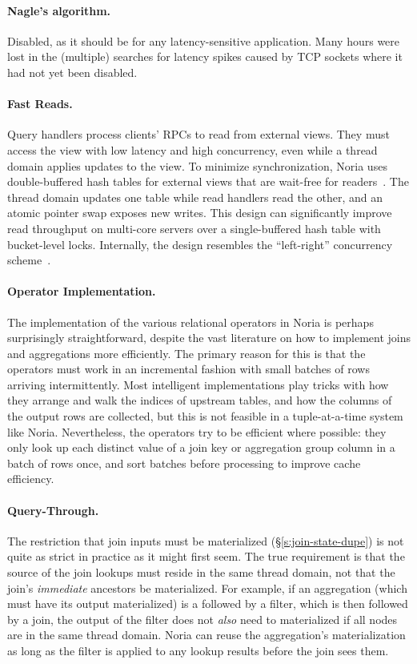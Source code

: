 \paragraph{Nagle's algorithm.} Disabled, as it should be for any
latency-sensitive application. Many hours were lost in the (multiple) searches
for latency spikes caused by TCP sockets where it had not yet been disabled.

\paragraph{Fast Reads.}
Query handlers process clients' RPCs to read from external views. They must
access the view with low latency and high concurrency, even while a thread
domain applies updates to the view. To minimize synchronization, Noria uses
double-buffered hash tables for external views that are wait-free for
readers~\cite{evmap}. The thread domain updates one table while read handlers
read the other, and an atomic pointer swap exposes new writes. This design can
significantly improve read throughput on multi-core servers over a
single-buffered hash table with bucket-level locks. Internally, the design
resembles the ``left-right'' concurrency scheme~\cite{left-right}.

\paragraph{Operator Implementation.}
The implementation of the various relational operators in Noria is perhaps
surprisingly straightforward, despite the vast literature on how to implement
joins and aggregations more efficiently. The primary reason for this is that the
operators must work in an incremental fashion with small batches of rows
arriving intermittently. Most intelligent implementations play tricks with how
they arrange and walk the indices of upstream tables, and how the columns of the
output rows are collected, but this is not feasible in a tuple-at-a-time system
like Noria. Nevertheless, the operators try to be efficient where possible: they
only look up each distinct value of a join key or aggregation group column in a
batch of rows once, and sort batches before processing to improve cache
efficiency.

\paragraph{Query-Through.}
The restriction that join inputs must be materialized
(\S\ref{s:join-state-dupe}) is not quite as strict in practice as it might first
seem. The true requirement is that the source of the join lookups must reside in
the same thread domain, not that the join's \emph{immediate} ancestors be
materialized. For example, if an aggregation (which must have its output
materialized) is a followed by a filter, which is then followed by a join, the
output of the filter does not \emph{also} need to materialized if all nodes are
in the same thread domain. Noria can reuse the aggregation's materialization as
long as the filter is applied to any lookup results before the join sees them.
